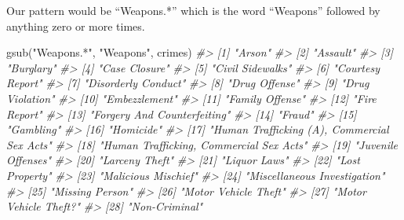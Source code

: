 \documentclass[
]{krantz}
\makeatletter
\newenvironment{Shaded}{\begin{snugshade}}{\end{snugshade}}
\newcommand{\CommentTok}[1]{\textcolor[rgb]{0.37,0.37,0.37}{\textit{#1}}}
\newcommand{\FunctionTok}[1]{\textcolor[rgb]{0,0,0}{#1}}
\newcommand{\NormalTok}[1]{#1}
\newcommand{\StringTok}[1]{\textcolor[rgb]{0.5,0.5,0.5}{#1}}
\newenvironment{kframe}{%
\medskip{}
\setlength{\fboxsep}{.8em}
 \def\at@end@of@kframe{}%
 \ifinner\ifhmode%
  \def\at@end@of@kframe{\end{minipage}}%
  \begin{minipage}{\columnwidth}%
 \fi\fi%
 \def\FrameCommand##1{\hskip\@totalleftmargin \hskip-\fboxsep
 \colorbox{shadecolor}{##1}\hskip-\fboxsep
     \hskip-\linewidth \hskip-\@totalleftmargin \hskip\columnwidth}%
 \MakeFramed {\advance\hsize-\width
   \@totalleftmargin\z@ \linewidth\hsize
   \@setminipage}}%
 {\par\unskip\endMakeFramed%
 \at@end@of@kframe}
\renewenvironment{Shaded}{\begin{kframe}}{\end{kframe}}
\makeatother
\begin{document}
Our pattern would be ``Weapons.*'' which is the word
``Weapons'' followed by anything zero or more times.

\begin{Shaded}
\begin{Highlighting}[]
\FunctionTok{gsub}\NormalTok{(}\StringTok{"Weapons.*"}\NormalTok{, }\StringTok{"Weapons"}\NormalTok{, crimes)}
\CommentTok{\#\textgreater{}  [1] "Arson"                                     }
\CommentTok{\#\textgreater{}  [2] "Assault"                                   }
\CommentTok{\#\textgreater{}  [3] "Burglary"                                  }
\CommentTok{\#\textgreater{}  [4] "Case Closure"                              }
\CommentTok{\#\textgreater{}  [5] "Civil Sidewalks"                           }
\CommentTok{\#\textgreater{}  [6] "Courtesy Report"                           }
\CommentTok{\#\textgreater{}  [7] "Disorderly Conduct"                        }
\CommentTok{\#\textgreater{}  [8] "Drug Offense"                              }
\CommentTok{\#\textgreater{}  [9] "Drug Violation"                            }
\CommentTok{\#\textgreater{} [10] "Embezzlement"                              }
\CommentTok{\#\textgreater{} [11] "Family Offense"                            }
\CommentTok{\#\textgreater{} [12] "Fire Report"                               }
\CommentTok{\#\textgreater{} [13] "Forgery And Counterfeiting"                }
\CommentTok{\#\textgreater{} [14] "Fraud"                                     }
\CommentTok{\#\textgreater{} [15] "Gambling"                                  }
\CommentTok{\#\textgreater{} [16] "Homicide"                                  }
\CommentTok{\#\textgreater{} [17] "Human Trafficking (A), Commercial Sex Acts"}
\CommentTok{\#\textgreater{} [18] "Human Trafficking, Commercial Sex Acts"    }
\CommentTok{\#\textgreater{} [19] "Juvenile Offenses"                         }
\CommentTok{\#\textgreater{} [20] "Larceny Theft"                             }
\CommentTok{\#\textgreater{} [21] "Liquor Laws"                               }
\CommentTok{\#\textgreater{} [22] "Lost Property"                             }
\CommentTok{\#\textgreater{} [23] "Malicious Mischief"                        }
\CommentTok{\#\textgreater{} [24] "Miscellaneous Investigation"               }
\CommentTok{\#\textgreater{} [25] "Missing Person"                            }
\CommentTok{\#\textgreater{} [26] "Motor Vehicle Theft"                       }
\CommentTok{\#\textgreater{} [27] "Motor Vehicle Theft?"                      }
\CommentTok{\#\textgreater{} [28] "Non{-}Criminal"                              }

\end{Highlighting}
\end{Shaded}
\end{document}
